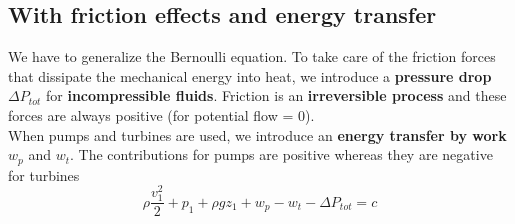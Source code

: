 			\subsection{With friction effects and energy transfer}
				We have to generalize the Bernoulli equation. To take care of the friction forces that dissipate the mechanical energy into heat, we introduce a \textbf{pressure drop} $\Delta P_{tot}$ for \textbf{incompressible fluids}. Friction is an \textbf{irreversible process} and these forces are always positive (for potential flow = 0). \\
				When pumps and turbines are used, we introduce an \textbf{energy transfer by work} $w_p$ and $w_t$. The contributions for pumps are positive whereas they are negative for turbines 
				\begin{equation}
					\rho \frac{v_1^2}{2} + p_1 + \rho gz_1 + w_p -w_t - \Delta P_{tot} = c
				\end{equation}
				
\newpage				
				
